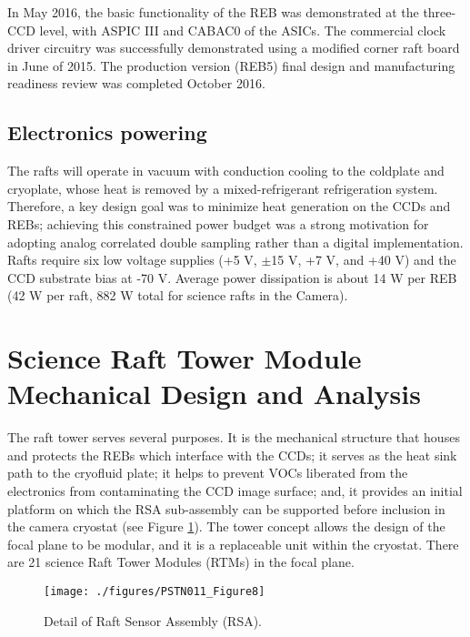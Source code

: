 In May 2016, the basic functionality of the REB was demonstrated at the three-CCD level, with ASPIC III and CABAC0 of the ASICs. The commercial clock driver circuitry was successfully demonstrated using a modified corner raft board in June of 2015. The production version (REB5) final design and manufacturing readiness review was completed October 2016.

\subsection{Electronics powering}
The rafts will operate in vacuum with conduction cooling to the coldplate and cryoplate, whose heat is removed by a mixed-refrigerant refrigeration system. Therefore, a key design goal was to minimize heat generation on the CCDs and REBs; achieving this constrained power budget was a strong motivation for adopting analog correlated double sampling rather than a digital implementation. Rafts require six low voltage supplies (+5 V, $\pm$15 V, +7 V, and +40 V) and the CCD substrate bias at -70 V. Average power dissipation is about 14 W per REB (42 W per raft, 882 W total for science rafts in the Camera).

\section{Science Raft Tower Module Mechanical Design and Analysis}

The raft tower serves several purposes. It is the mechanical structure that houses and protects the REBs which interface with the CCDs; it serves as the heat sink path to the cryofluid plate; it helps to prevent VOCs liberated from the electronics from contaminating the CCD image surface; and, it provides an initial platform on which the RSA sub-assembly can be supported before inclusion in the camera cryostat (see Figure \ref{fig:Fig8}). The tower concept allows the design of the focal plane to be modular, and it is a replaceable unit within the cryostat. There are 21 science Raft Tower Modules (RTMs) in the focal plane.
 
\begin{figure}[htbp]
\begin{center}
\texttt{[image: ./figures/PSTN011\_Figure8]}
\caption{Detail of Raft Sensor Assembly (RSA).}
\label{fig:Fig8}
\end{center}
\end{figure}

